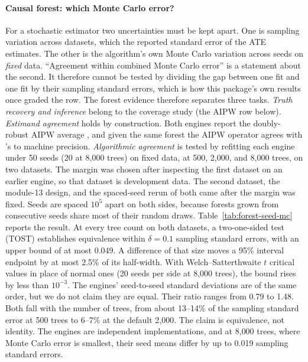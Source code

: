 \paragraph{Causal forest: which Monte Carlo error?}
For a stochastic estimator two uncertainties must be kept apart. One is
sampling variation across datasets, which the reported standard error of
the ATE estimates. The other is the algorithm's own Monte Carlo
variation across seeds on \emph{fixed} data. ``Agreement within combined
Monte Carlo error'' is a statement about the second. It therefore cannot
be tested by dividing the gap between one \statspai{} fit and one
 fit by their sampling standard errors, which is how this
package's own results once graded the row. The forest evidence therefore
separates three tasks. \emph{Truth recovery and inference} belong to
the coverage study (the AIPW row below). \emph{Estimand agreement} holds by
construction. Both engines report the doubly-robust AIPW average
\citep{athey2019generalized}, and given the same forest the AIPW
operator agrees with 's to machine precision.
\emph{Algorithmic agreement} is tested by refitting each engine under 50
seeds (20 at 8{,}000 trees) on fixed data, at 500, 2{,}000, and 8{,}000
trees, on two datasets.
The margin was chosen after inspecting the first dataset on an earlier
engine, so that dataset is development data. The second dataset, the
module-13 design, and the spaced-seed rerun of both came after the margin
was fixed. Seeds
are spaced \(10^5\) apart on both sides, because  forests grown
from consecutive seeds share most of their random draws.
Table~\ref{tab:forest-seed-mc} reports the result. At every tree count
on both datasets, a two-one-sided test (TOST) establishes equivalence within
\(\delta = 0.1\) sampling standard errors, with an upper bound of at
most 0.049. A difference of that size moves a 95\% interval endpoint by
at most 2.5\% of its half-width. With Welch--Satterthwaite \(t\) critical
values in place of normal ones (20 seeds per side at 8{,}000 trees), the
bound rises by less than \(10^{-3}\). The engines' seed-to-seed
standard deviations are of the same order, but we do not claim they are
equal. Their ratio ranges from 0.79 to 1.48. Both fall with the number
of trees, from about 13--14\% of the sampling standard error at 500
trees to 6--7\% at the default 2{,}000. The claim is equivalence, not
identity. The engines are independent implementations, and at 8{,}000
trees, where Monte Carlo error is smallest, their seed means differ by
up to 0.019 sampling standard errors.

